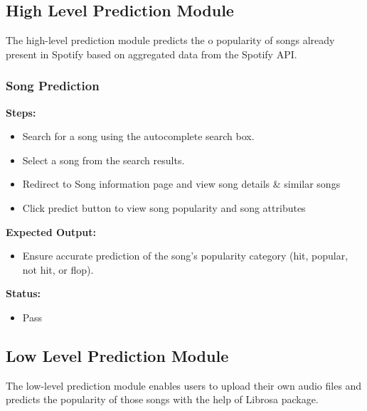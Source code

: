 \documentclass[11pt]{report}
\begin{document}
\subsection{High Level Prediction Module}
The high-level prediction module predicts the o popularity of songs already present in Spotify based on aggregated data from the Spotify API.

\subsubsection*{Song Prediction}
\textbf{Steps:}
\begin{itemize}
    \item Search for a song using the autocomplete search box.
    \item Select a song from the search results.
    \item Redirect to Song information page and view song details \& similar songs
    \item Click predict button to view song popularity and song attributes
\end{itemize}
\textbf{Expected Output:}
\begin{itemize}
    \item Ensure accurate prediction of the song's popularity category (hit, popular, not hit, or flop).
\end{itemize}
\textbf{Status:}
\begin{itemize}
    \item Pass
\end{itemize}

\subsection{Low Level Prediction Module}
The low-level prediction module enables users to upload their own audio files and predicts the popularity of those songs with the help of Librosa package.
\end{document}
